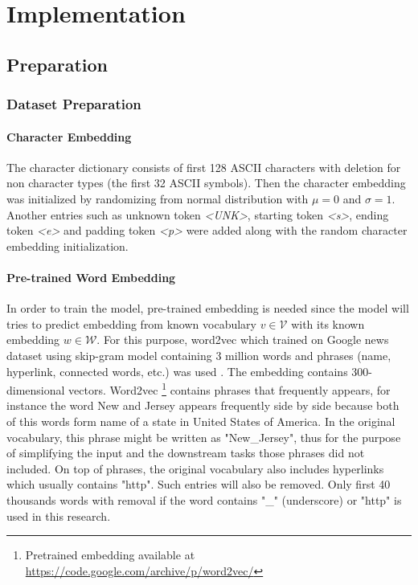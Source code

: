 \chapter{Implementation}
\label{chap:implementation}

\section{Preparation}
    \subsection{Dataset Preparation}
        \subsubsection{Character Embedding}
            The character dictionary consists of first 128 ASCII
            characters with deletion for non character types (the
            first 32 ASCII symbols). Then the character embedding was
            initialized by randomizing from normal distribution with
            $\mu = 0$ and $\sigma = 1$. Another entries such as
            unknown token \textit{\textless UNK\textgreater}, starting
            token \textit{\textless s\textgreater}, ending token
            \textit{\textless e\textgreater} and padding token
            \textit{\textless p\textgreater} were added along with the
            random character embedding initialization.

        \subsubsection{Pre-trained Word Embedding}
            In order to train the model, pre-trained embedding is
            needed since the model will tries to predict embedding
            from known vocabulary $v \in \mathcal{V}$ with its known
            embedding $w \in \mathcal{W}$. For this purpose, word2vec
            which trained on Google news dataset using skip-gram model
            containing 3 million words and phrases (name, hyperlink,
            connected words, etc.) was used
            \citep{Distributed2013mikolov}. The embedding contains
            300-dimensional vectors. Word2vec \footnote{Pretrained
            embedding available at 
            \url{https://code.google.com/archive/p/word2vec/}}
            contains phrases that frequently appears, for instance the
            word New and Jersey appears frequently side by side
            because both of this words form name of a state in United
            States of America. In the original vocabulary, this phrase
            might be written as "New\_Jersey", thus for the purpose of
            simplifying the input and the downstream tasks those
            phrases did not included. On top of phrases, the original
            vocabulary also includes hyperlinks which usually contains
            "http". Such entries will also be removed. Only first 40
            thousands words with removal if the word contains "\_"
            (underscore) or "http" is used in this research.
            
